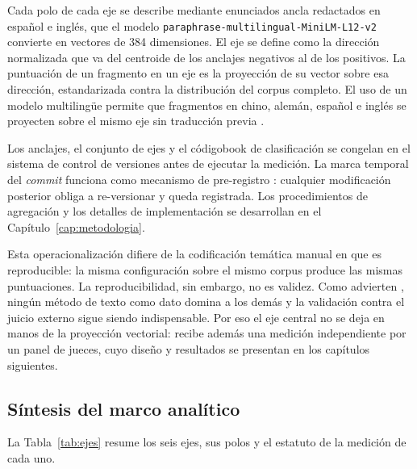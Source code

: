 Cada polo de cada eje se describe mediante enunciados ancla redactados en español e inglés, que el modelo \texttt{paraphrase-multilingual-MiniLM-L12-v2} convierte en vectores de 384 dimensiones. El eje se define como la dirección normalizada que va del centroide de los anclajes negativos al de los positivos. La puntuación de un fragmento en un eje es la proyección de su vector sobre esa dirección, estandarizada contra la distribución del corpus completo. El uso de un modelo multilingüe permite que fragmentos en chino, alemán, español e inglés se proyecten sobre el mismo eje sin traducción previa \citep{reimers2020multilingual}.

Los anclajes, el conjunto de ejes y el códigobook de clasificación se congelan en el sistema de control de versiones antes de ejecutar la medición. La marca temporal del \textit{commit} funciona como mecanismo de pre-registro \citep{nosek2018preregistration}: cualquier modificación posterior obliga a re-versionar y queda registrada. Los procedimientos de agregación y los detalles de implementación se desarrollan en el Capítulo~\ref{cap:metodologia}.

Esta operacionalización difiere de la codificación temática manual \citep{krippendorff2018content} en que es reproducible: la misma configuración sobre el mismo corpus produce las mismas puntuaciones. La reproducibilidad, sin embargo, no es validez. Como advierten \citet{grimmer2022text}, ningún método de texto como dato domina a los demás y la validación contra el juicio externo sigue siendo indispensable. Por eso el eje central no se deja en manos de la proyección vectorial: recibe además una medición independiente por un panel de jueces, cuyo diseño y resultados se presentan en los capítulos siguientes.


\subsection{Síntesis del marco analítico}

La Tabla~\ref{tab:ejes} resume los seis ejes, sus polos y el estatuto de la medición de cada uno.

